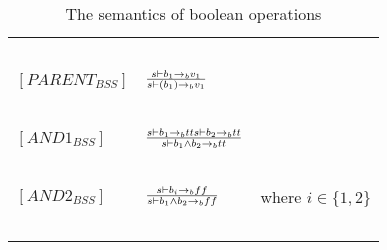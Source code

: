 \begin{table}[h]
\begin{tabular}{|l|l|l|}
			~			&															~																			& ~ \\
	$[PARENT_{BSS}]$	& $s \vdash b_{1} \rightarrow_{b} v_{1} \over s \vdash (b_{1}) \rightarrow_{b} v_{1}$													& ~ \\
			~			&															~																			& ~ \\
	$[AND1_{BSS}]$		& $s \vdash b_{1} \rightarrow_{b} tt  s \vdash b_{2} \rightarrow_{b} tt \over s \vdash b_{1} \wedge b_{2} \rightarrow_{b} tt$			& ~ \\
			~			&															~																			& ~ \\
	$[AND2_{BSS}]$		& $s \vdash b_{i} \rightarrow_{b} ff \over s \vdash b_{1} \wedge b_{2} \rightarrow_{b} ff$												& where $i \in \{1,2\}$ \\
			~			&															~																			& ~ \\
	\hline
	\end{tabular}
	\label{tab:semantics_boolean}
	\caption{The semantics of boolean operations}
\end{table}

